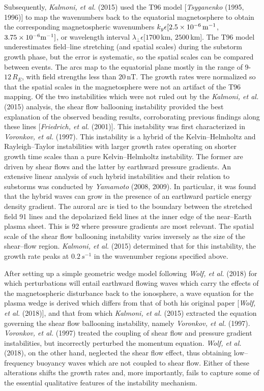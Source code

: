 \documentclass[a4paper,openany,12pt]{book}
\begin{document}
Subsequently, \emph{Kalmoni, et al.} (2015) used the T96 model [\emph{Tsyganenko} (1995, 1996)] to map the wavenumbers back to the equatorial magnetosphere to obtain the corresponding magnetospheric wavenumbers $k_y\epsilon[2.5\times 10^{-6}\,{\rm m}^{-1}$, $3.75\times 10^{-6}{\rm m}^{-1}]$, or wavelength interval $\lambda_\perp\epsilon[1700\,$km, $2500\,$km]. The T96 model underestimates field--line stretching (and spatial scales) during the substorm growth phase, but the error is systematic, so the spatial scales can be compared between events. The arcs map to the equatorial plane mostly in the range of 9-$12\,R_E$, with field strengths less than $20\,$nT. The growth rates were normalized so that the spatial scales in the magnetosphere were not an artifact of the T96 mapping. 
%
Of the two instabilities which were not ruled out by the \emph{Kalmoni, et al.} (2015) analysis, the shear flow ballooning instability provided the best explanation of the observed beading results, corroborating previous findings along these lines [\emph{Friedrich, et al.} (2001)]. This instability was first characterized in \emph{Voronkov, et al.} (1997). This instability is a hybrid of the Kelvin--Helmholtz and Rayleigh--Taylor instabilities with larger growth rates operating on shorter growth time scales than a pure Kelvin--Helmholtz instability. The former are driven by shear flows and the latter by earthward pressure gradients. An extensive linear analysis of such hybrid instabilities and their relation to substorms was conducted by \emph{Yamamoto} (2008, 2009). In particular, it was found that the hybrid waves can grow in the presence of an earthward particle energy density gradient. The auroral arc is tied to the boundary between the stretched field 91 lines and the depolarized field lines at the inner edge of the near--Earth plasma sheet. This is 92 where pressure gradients are most relevant. The spatial scale of the shear flow ballooning instability varies inversely as the size of the shear--flow region. \emph{Kalmoni, et al.} (2015) determined that for this instability, the growth rate peaks at $0.2\,s^{-1}$ in the wavenumber regions specified above.

After setting up a simple geometric wedge model following \emph{Wolf, et al.} (2018) for which perturbations will entail earthward flowing waves which carry the effects of the magnetospheric disturbance back to the ionosphere, a wave equation for the plasma wedge is derived which differs from that of both his original paper [\emph{Wolf, et al.} (2018)], and that from which \emph{Kalmoni, et al.} (2015) extracted the equation governing the shear flow ballooning instability, namely \emph{Voronkov, et al.} (1997). \emph{Voronkov, et al.} (1997) treated the coupling of shear flow and pressure gradient instabilities, but incorrectly perturbed the momentum equation. \emph{Wolf, et al.} (2018), on the other hand, neglected the shear flow effect, thus obtaining low--frequency buoyancy waves which are not coupled to shear flow. Either of these alterations shifts the growth rates and, more importantly, fails to capture some of the essential qualitative features of the instability mechanism.
\end{document}
